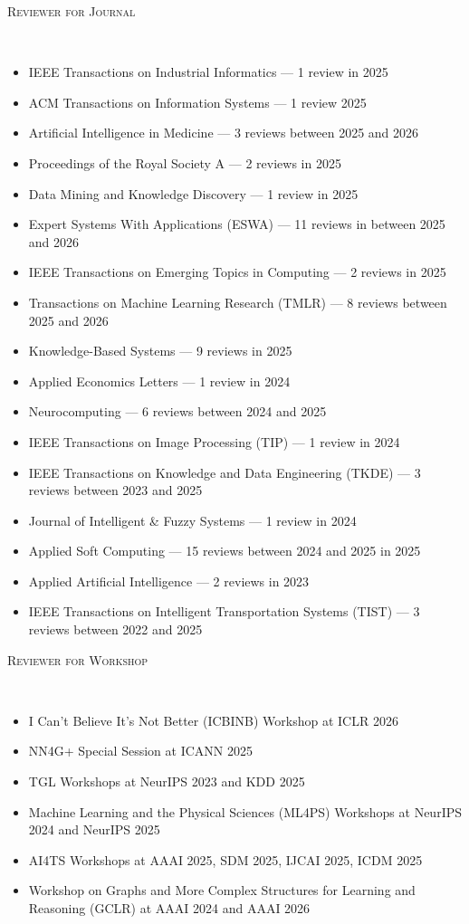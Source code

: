 \documentclass[10pt]{article}
\newenvironment{changemargin}[2]{
  \begin{list}{}{
    \setlength{\topsep}{0pt}
    \setlength{\leftmargin}{#1}
    \setlength{\rightmargin}{#2}
    \setlength{\listparindent}{\parindent}
    \setlength{\itemindent}{\parindent}
    \setlength{\parsep}{\parskip}
  }
  \item[]}{\end{list}
}
\newcommand{\lineover}{
	\begin{changemargin}{-0.05in}{-0.05in}
		\vspace*{-8pt}
		\hrulefill \\
		\vspace*{-2pt}
	\end{changemargin}
}
\newenvironment{body} {
	\vspace*{-16pt}
	\begin{changemargin}{-0.25in}{-0.5in}
  }
	{\end{changemargin}
}
\begin{document}
\begin{body}
\begin{itemize}
    \end{itemize}
    \vspace{1em}
    \textsc{Reviewer for Journal}
    \lineover
    \begin{itemize}
        \item IEEE Transactions on Industrial Informatics — 1 review in 2025
        \item ACM Transactions on Information Systems — 1 review 2025
        \item Artificial Intelligence in Medicine — 3 reviews between 2025 and 2026
        \item Proceedings of the Royal Society A — 2 reviews in 2025 
        \item Data Mining and Knowledge Discovery — 1 review in 2025
        \item Expert Systems With Applications (ESWA) — 11 reviews in between 2025 and 2026
        \item IEEE Transactions on Emerging Topics in Computing — 2 reviews in 2025
        \item Transactions on Machine Learning Research (TMLR) — 8 reviews between 2025 and 2026 
        \item Knowledge-Based Systems — 9 reviews in 2025
        \item Applied Economics Letters — 1 review in 2024
        \item Neurocomputing — 6 reviews between 2024 and 2025 
        \item IEEE Transactions on Image Processing (TIP) — 1 review in 2024 
        \item IEEE Transactions on Knowledge and Data Engineering (TKDE) — 3 reviews between 2023 and 2025
        \item Journal of Intelligent \& Fuzzy Systems — 1 review in 2024
        \item Applied Soft Computing — 15 reviews between 2024 and 2025 in 2025
        \item Applied Artificial Intelligence — 2 reviews in 2023
        \item IEEE Transactions on Intelligent Transportation Systems (TIST) — 3 reviews between 2022 and 2025
    \end{itemize}
    \vspace{1em}
   \textsc{Reviewer for Workshop}
    \lineover
    \begin{itemize}
        \item I Can’t Believe It’s Not Better (ICBINB) Workshop at ICLR 2026
        \item NN4G+ Special Session at ICANN 2025
        \item TGL Workshops at NeurIPS 2023 and KDD 2025
        \item Machine Learning and the Physical Sciences (ML4PS) Workshops at NeurIPS 2024 and NeurIPS 2025
        \item AI4TS Workshops at AAAI 2025,  SDM 2025,  IJCAI 2025, ICDM 2025
        \item Workshop on Graphs and More Complex Structures for Learning and Reasoning (GCLR) at AAAI 2024 and AAAI 2026
    \end{itemize}
\end{body}
\end{document}
